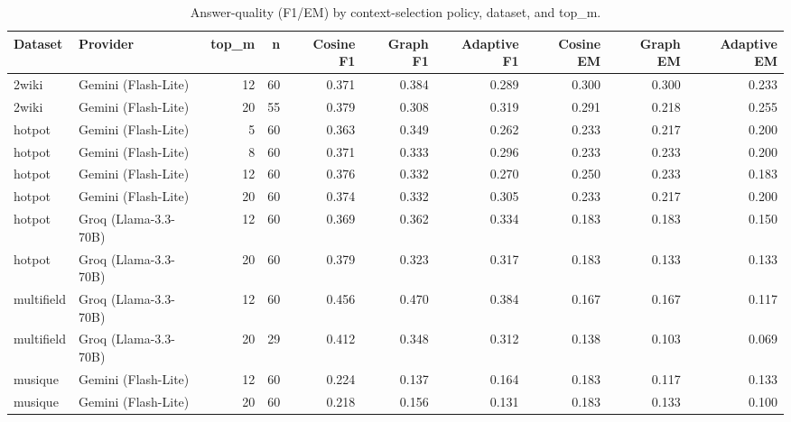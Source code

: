 \begin{table}
\caption{Answer-quality (F1/EM) by context-selection policy, dataset, and top\_m.}
\label{tab:qa_quality}
\begin{tabular}{llrrrrrrrr}
\toprule
Dataset & Provider & top\_m & n & Cosine F1 & Graph F1 & Adaptive F1 & Cosine EM & Graph EM & Adaptive EM \\
\midrule
2wiki & Gemini (Flash-Lite) & 12 & 60 & 0.371 & 0.384 & 0.289 & 0.300 & 0.300 & 0.233 \\
2wiki & Gemini (Flash-Lite) & 20 & 55 & 0.379 & 0.308 & 0.319 & 0.291 & 0.218 & 0.255 \\
hotpot & Gemini (Flash-Lite) & 5 & 60 & 0.363 & 0.349 & 0.262 & 0.233 & 0.217 & 0.200 \\
hotpot & Gemini (Flash-Lite) & 8 & 60 & 0.371 & 0.333 & 0.296 & 0.233 & 0.233 & 0.200 \\
hotpot & Gemini (Flash-Lite) & 12 & 60 & 0.376 & 0.332 & 0.270 & 0.250 & 0.233 & 0.183 \\
hotpot & Gemini (Flash-Lite) & 20 & 60 & 0.374 & 0.332 & 0.305 & 0.233 & 0.217 & 0.200 \\
hotpot & Groq (Llama-3.3-70B) & 12 & 60 & 0.369 & 0.362 & 0.334 & 0.183 & 0.183 & 0.150 \\
hotpot & Groq (Llama-3.3-70B) & 20 & 60 & 0.379 & 0.323 & 0.317 & 0.183 & 0.133 & 0.133 \\
multifield & Groq (Llama-3.3-70B) & 12 & 60 & 0.456 & 0.470 & 0.384 & 0.167 & 0.167 & 0.117 \\
multifield & Groq (Llama-3.3-70B) & 20 & 29 & 0.412 & 0.348 & 0.312 & 0.138 & 0.103 & 0.069 \\
musique & Gemini (Flash-Lite) & 12 & 60 & 0.224 & 0.137 & 0.164 & 0.183 & 0.117 & 0.133 \\
musique & Gemini (Flash-Lite) & 20 & 60 & 0.218 & 0.156 & 0.131 & 0.183 & 0.133 & 0.100 \\
\bottomrule
\end{tabular}
\end{table}
